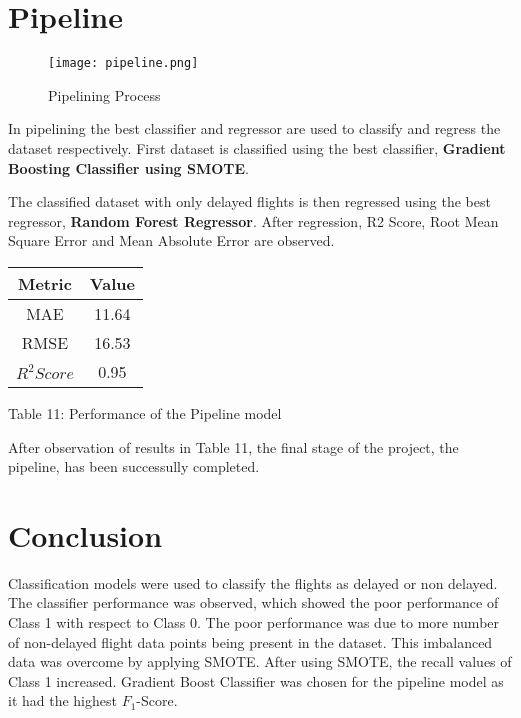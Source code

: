 \documentclass[12pt,letter-paper]{article}
\begin{document}
\section{Pipeline}

    \begin{figure}[H]%
        \begin{center}
            \texttt{[image: pipeline.png]}%
                \caption{Pipelining Process}
        \end{center}
    \end{figure}
    
    In pipelining the best classifier and regressor  are used to classify and regress the dataset respectively. First dataset is classified using the best classifier, {\bfseries Gradient Boosting Classifier using SMOTE}. 
    
    The classified dataset with only delayed flights is then regressed using the best regressor, {\bfseries Random Forest Regressor}. After regression, R2 Score, Root Mean Square Error and Mean Absolute Error are observed.

    \begin{center}
        \begin{tabular}{ |c|c|} 
         \hline
         Metric & Value\\ 
         \hline
         MAE & 11.64 \\  
         \hline
         RMSE & 16.53\\ 
         \hline
         $R^2 Score$ & 0.95\\ 
         \hline
        \end{tabular}
    \end{center}
    \begin{center}
            Table 11: Performance of the Pipeline model
    \end{center}
    
    After observation of results in Table 11, the final stage of the project, the pipeline, has been successully completed. 
\section{Conclusion}
    
    Classification models were used to classify the flights as delayed or non delayed. The classifier performance was observed, which showed the poor performance of Class 1 with respect to Class 0. The poor performance was due to more number of non-delayed flight data points being present in the dataset. This imbalanced data was overcome by applying SMOTE. After using SMOTE, the recall values of Class 1 increased. Gradient Boost Classifier was chosen for the pipeline model as it had the highest $F_1$-Score.
    
\end{document}

